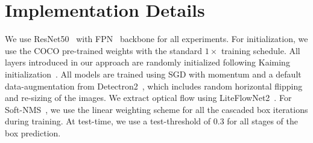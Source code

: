 \section{Implementation Details}
We use
ResNet50~\cite{he2016deep} with FPN~\cite{lin2017feature} backbone for all experiments. 
For initialization, we use the COCO pre-trained weights with the standard $1\times$ training schedule. 
All layers introduced in our approach are randomly initialized following Kaiming initialization~\cite{he2015delving}.  %
%
All models are trained using SGD with momentum and a default data-augmentation from Detectron2~\cite{wu2019detectron2}, which includes random horizontal flipping and re-sizing of the images. We extract optical flow using LiteFlowNet2~\cite{hui2020lightweight}.
For Soft-NMS~\cite{bodla2017soft}, we use the linear weighting scheme for all the cascaded box iterations during training. At test-time, we use a test-threshold of $0.3$ for all stages of the box prediction.
